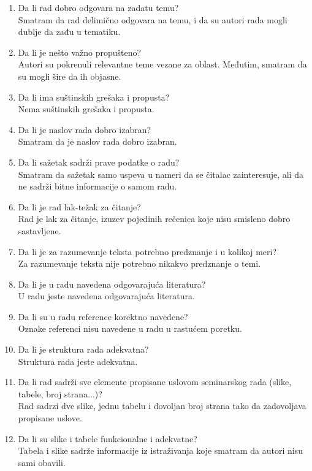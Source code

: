 \documentclass[a4paper]{report}
\begin{document}
\begin{enumerate}
\item Da li rad dobro odgovara na zadatu temu?\\
Smatram da rad delimično odgovara na temu, i da su autori rada mogli dublje da zađu u tematiku.
\item Da li je nešto važno propušteno?\\
Autori su pokrenuli relevantne teme vezane za oblast. Međutim, smatram da su mogli šire da ih objasne.
\item Da li ima suštinskih grešaka i propusta?\\
Nema suštinskih grešaka i propusta.
\item Da li je naslov rada dobro izabran?\\
Smatram da je naslov rada dobro izabran.
\item Da li sažetak sadrži prave podatke o radu?\\
Smatram da sažetak samo uspeva u nameri da se čitalac zainteresuje, ali da ne sadrži bitne informacije o samom radu.
\item Da li je rad lak-težak za čitanje?\\
Rad je lak za čitanje, izuzev pojedinih rečenica koje nisu smisleno dobro sastavljene.
\item Da li je za razumevanje teksta potrebno predznanje i u kolikoj meri?\\
Za razumevanje teksta nije potrebno nikakvo predznanje o temi.
\item Da li je u radu navedena odgovarajuća literatura?\\
U radu jeste navedena odgovarajuća literatura.
\item Da li su u radu reference korektno navedene?\\
Oznake referenci nisu navedene u radu u rastućem poretku.
\item Da li je struktura rada adekvatna?\\
Struktura rada jeste adekvatna.
\item Da li rad sadrži sve elemente propisane uslovom seminarskog rada (slike, tabele, broj strana...)?\\
Rad sadrzi dve slike, jednu tabelu i dovoljan broj strana tako da zadovoljava propisane uslove.
\item Da li su slike i tabele funkcionalne i adekvatne?\\
Tabela i slike sadrže informacije iz istraživanja koje smatram da autori nisu sami obavili. 
\end{enumerate}
\end{document}
